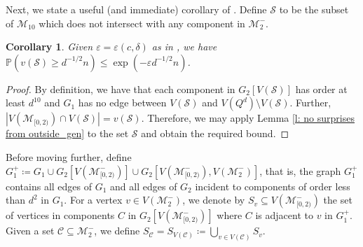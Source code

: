 \documentclass[reqno,final,a4paper]{amsart}
\newtheorem{corollary}[thm]{Corollary}
\theoremstyle{definition}
\newcommand{\cC}{\mathcal{C}}
\newcommand{\cM}{\mathcal{M}}
\newcommand{\cS}{\mathcal{S}}
\def\eps{\varepsilon}
\newcommand{\1}{\mathbbm{1}}
\begin{document}
Next, we state a useful (and immediate) corollary of .
Define $\cS$ to be the subset of $\cM_{10}$ which does not intersect with any component in $\cM_2^-$.

\begin{corollary}\label{l: no surprises from outside}
Given $\eps = \eps(c,\delta)$ as in , we have $\mathbb{P}(v(\cS)\ge d^{-1/2} n)\le \exp(-\eps d^{-1/2} n)$.
\end{corollary}
\begin{proof}
By definition, we have that each component in $G_2[V(\cS)]$ has order at least $d^{10}$ and $G_1$ has no edge between $V(\cS)$ and $V(Q^d)\setminus V(\cS)$. Further, $|V(\cM_{[0,2)})\cap V(\cS)|=v(\cS)$. Therefore, we may apply Lemma \ref{l: no surprises from outside_gen} to the set $\cS$ and obtain the required bound.
\end{proof}

Before moving further, define $G_1^+\coloneqq G_1\cup G_2[V(\cM_{[0,2)}^-)]\cup G_2[V(\cM_{[0,2)}^-),V(\cM_2^-)]$, that is, the graph $G_1^+$ contains all edges of $G_1$ and all edges of $G_2$ incident to components of order less than $d^2$ in $G_1$. 
For a vertex $v\in V(\cM_2^-)$, we denote by $S_v\subseteq V(\cM_{[0,2)}^-)$ the set of vertices in components $C$ in $G_2[V(\cM_{[0,2)}^-)]$ where $C$ is adjacent to $v$ in $G_1^+$. 
Given a set $\cC\subseteq \cM_2^-$, we define $S_{\cC} = S_{V(\cC)} \coloneqq \bigcup_{v\in V(\cC)} S_v$.
\end{document}
